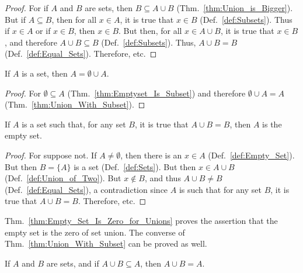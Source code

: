 \documentclass[crop=false,class=book,oneside]{standalone}
\begin{document}
            \begin{proof}
                For if $A$ and $B$ are sets, then
                $B\subseteq{A}\cup{B}$
                (Thm.~\ref{thm:Union_is_Bigger}).
                But if $A\subseteq{B}$, then for all $x\in{A}$,
                it is true that $x\in{B}$
                (Def.~\ref{def:Subsets}). Thus if $x\in{A}$ or if
                $x\in{B}$, then $x\in{B}$. But then, for all
                $x\in{A}\cup{B}$, it is true that $x\in{B}$, and
                therefore $A\cup{B}\subseteq{B}$
                (Def.~\ref{def:Subsets}). Thus,
                $A\cup{B}=B$ (Def.~\ref{def:Equal_Sets}).
                Therefore, etc.
            \end{proof}
            \begin{theorem}
                \label{thm:Union_with_Emptyset}%
                If $A$ is a set, then $A=\emptyset\cup{A}$.
            \end{theorem}
            \begin{proof}
                For $\emptyset\subseteq{A}$
                (Thm.~\ref{thm:Emptyset_Is_Subset}) and
                therefore $\emptyset\cup{A}=A$
                (Thm.~\ref{thm:Union_With_Subset}).
            \end{proof}
            \begin{theorem}
                \label{thm:Empty_Set_Is_Zero_for_Unions}%
                If $A$ is a set such that, for any set $B$, it is
                true that $A\cup{B}=B$, then $A$ is the
                empty set.
            \end{theorem}
            \begin{proof}
                For suppose not. If $A\ne\emptyset$, then there
                is an $x\in{A}$ (Def.~\ref{def:Empty_Set}).
                But then $B=\{A\}$ is a set
                (Def.~\ref{def:Sets}). But then $x\in{A}\cup{B}$
                (Def.~\ref{def:Union_of_Two}). But $x\notin{B}$,
                and thus $A\cup{B}\ne{B}$
                (Def.~\ref{def:Equal_Sets}), a contradiction
                since $A$ is such that for any set $B$, it is
                true that $A\cup{B}=B$. Therefore, etc.
            \end{proof}
            Thm.~\ref{thm:Empty_Set_Is_Zero_for_Unions} proves
            the assertion that the empty set is the zero of set
            union. The converse of
            Thm.~\ref{thm:Union_With_Subset} can be proved as
            well.
            \begin{theorem}
                \label{thm:Conv_Union_Is_Bigger}%
                If $A$ and $B$ are sets, and if
                $A\cup{B}\subseteq{A}$, then $A\cup{B}=A$.
            \end{theorem}
\end{document}
